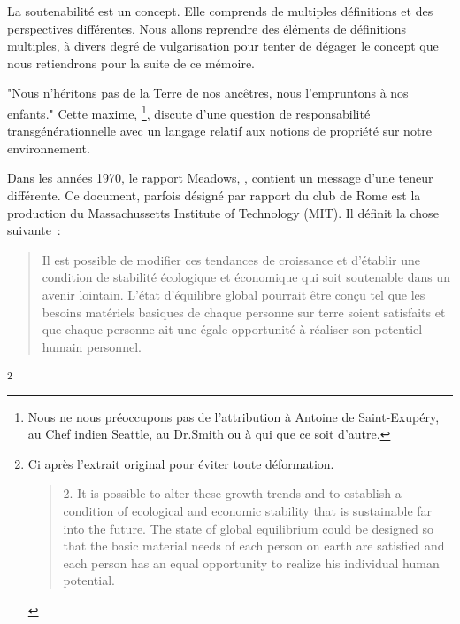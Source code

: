 La soutenabilité est un concept.
Elle comprends de multiples définitions et des perspectives différentes.
Nous allons reprendre des éléments de définitions multiples, à divers degré de vulgarisation pour tenter de dégager le concept que nous retiendrons pour la suite de ce mémoire.

"Nous n’héritons pas de la Terre de nos ancêtres, nous l’empruntons à nos enfants."
Cette maxime,
\footnote{Nous ne nous préoccupons pas de l'attribution à Antoine de Saint-Exupéry, au Chef indien Seattle, au Dr.Smith ou à qui que ce soit d'autre.},
discute d'une question de responsabilité transgénérationnelle avec un langage relatif aux notions de propriété sur notre environnement.

Dans les années 1970, le rapport Meadows, , contient un message d'une teneur différente.
Ce document, parfois désigné par rapport du club de Rome est la production du Massachussetts Institute of Technology (MIT).
Il définit la chose suivante~:
\blockcquote[traduction]{meadows_limits_1972}{
Il est possible de modifier ces tendances de croissance et d'établir une condition de stabilité écologique et économique qui soit soutenable dans un avenir lointain.
L'état d'équilibre global pourrait être conçu tel que les besoins matériels basiques de chaque personne sur terre soient satisfaits et que chaque personne ait une égale opportunité à réaliser son potentiel humain personnel.}
\footnote{Ci après l'extrait original pour éviter toute déformation.
\blockcquote[Introduction page 24]{meadows_limits_1972}{2. It is possible to alter these growth trends and to establish a condition of ecological and economic stability that is sustainable far into the future. The state of global equilibrium could be designed so that the basic material needs of each person on earth are satisfied and each person has an equal opportunity to realize his individual human potential.}
}
%

